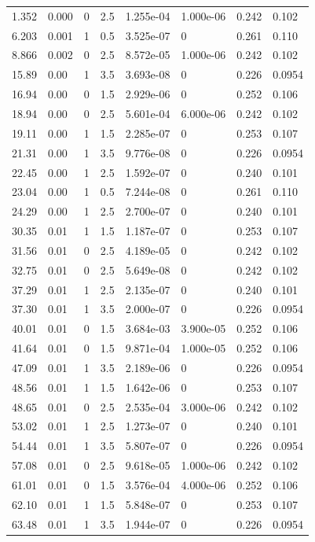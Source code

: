 \documentclass[preview]{standalone}
\begin{document}
{{\begin{tabular}{L{1.2cm}C{1.2cm} C{0.3cm}C{0.5cm} C{1.4cm}C{1.4cm} C{1.4cm}C{1.4cm}}
  1.352  &  0.000  & 0     & 2.5 &  1.255e-04  & 1.000e-06  & 0.242 &  0.102   \\ 
  6.203  &  0.001  & 1     & 0.5 &  3.525e-07  & 0  & 0.261 &  0.110   \\ 
  8.866  &  0.002  & 0     & 2.5 &  8.572e-05  & 1.000e-06  & 0.242 &  0.102   \\ 
  15.89  &  0.00  & 1     & 3.5 &  3.693e-08  & 0  & 0.226 &  0.0954   \\ 
  16.94  &  0.00  & 0     & 1.5 &  2.929e-06  & 0  & 0.252 &  0.106   \\ 
  18.94  &  0.00  & 0     & 2.5 &  5.601e-04  & 6.000e-06  & 0.242 &  0.102   \\ 
  19.11  &  0.00  & 1     & 1.5 &  2.285e-07  & 0  & 0.253 &  0.107   \\ 
  21.31  &  0.00  & 1     & 3.5 &  9.776e-08  & 0  & 0.226 &  0.0954   \\ 
  22.45  &  0.00  & 1     & 2.5 &  1.592e-07  & 0  & 0.240 &  0.101   \\ 
  23.04  &  0.00  & 1     & 0.5 &  7.244e-08  & 0  & 0.261 &  0.110   \\ 
  24.29  &  0.00  & 1     & 2.5 &  2.700e-07  & 0  & 0.240 &  0.101   \\ 
  30.35  &  0.01  & 1     & 1.5 &  1.187e-07  & 0  & 0.253 &  0.107   \\ 
  31.56  &  0.01  & 0     & 2.5 &  4.189e-05  & 0  & 0.242 &  0.102   \\ 
  32.75  &  0.01  & 0     & 2.5 &  5.649e-08  & 0  & 0.242 &  0.102   \\ 
  37.29  &  0.01  & 1     & 2.5 &  2.135e-07  & 0  & 0.240 &  0.101   \\ 
  37.30  &  0.01  & 1     & 3.5 &  2.000e-07  & 0  & 0.226 &  0.0954   \\ 
  40.01  &  0.01  & 0     & 1.5 &  3.684e-03  & 3.900e-05  & 0.252 &  0.106   \\ 
  41.64  &  0.01  & 0     & 1.5 &  9.871e-04  & 1.000e-05  & 0.252 &  0.106   \\ 
  47.09  &  0.01  & 1     & 3.5 &  2.189e-06  & 0  & 0.226 &  0.0954   \\ 
  48.56  &  0.01  & 1     & 1.5 &  1.642e-06  & 0  & 0.253 &  0.107   \\ 
  48.65  &  0.01  & 0     & 2.5 &  2.535e-04  & 3.000e-06  & 0.242 &  0.102   \\ 
  53.02  &  0.01  & 1     & 2.5 &  1.273e-07  & 0  & 0.240 &  0.101   \\ 
  54.44  &  0.01  & 1     & 3.5 &  5.807e-07  & 0  & 0.226 &  0.0954   \\ 
  57.08  &  0.01  & 0     & 2.5 &  9.618e-05  & 1.000e-06  & 0.242 &  0.102   \\ 
  61.01  &  0.01  & 0     & 1.5 &  3.576e-04  & 4.000e-06  & 0.252 &  0.106   \\ 
  62.10  &  0.01  & 1     & 1.5 &  5.848e-07  & 0  & 0.253 &  0.107   \\ 
  63.48  &  0.01  & 1     & 3.5 &  1.944e-07  & 0  & 0.226 &  0.0954   \\ 
\hline 
\end{tabular} 

}}
\end{document}
